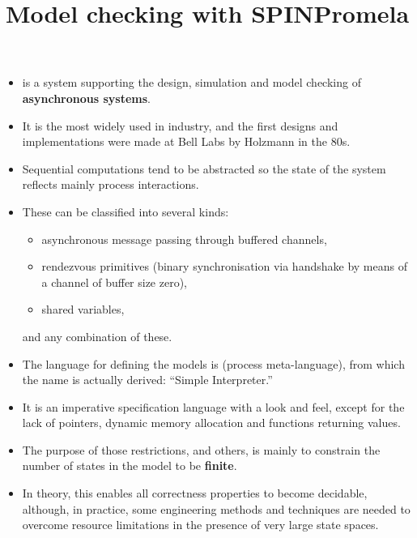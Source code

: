 \documentclass[wide]{slides}
\begin{document}
\begin{slide}
  \title{Model checking with SPIN}

  \begin{itemize}

    \item \SPIN is a system supporting the design, simulation
      and model checking of \textbf{asynchronous systems}.

    \item It is the most widely used in industry, and the first
      designs and implementations were made at Bell Labs by Holzmann
      in the 80s.

    \item Sequential computations tend to be abstracted so the state
      of the system reflects mainly process interactions.

    \item These can be classified into several kinds:
      \begin{itemize}

        \item asynchronous message passing through buffered channels,

        \item rendezvous primitives (binary synchronisation via
          handshake by means of a channel of buffer size zero),

        \item shared variables,

      \end{itemize}
      and any combination of these.

  \end{itemize}

\end{slide}

\begin{slide}
  \title{Promela}

  \begin{itemize}

    \item The language for defining the models is \Promela (process
      meta\hyp{}language), from which the name \SPIN is actually
      derived: ``Simple \Promela Interpreter.''

    \item It is an imperative specification language with a \Clang
      look and feel, except for the lack of pointers, dynamic memory
      allocation and functions returning values.

    \item The purpose of those restrictions, and others, is mainly to
      constrain the number of states in the model to be
      \textbf{finite}.

    \item In theory, this enables all correctness properties to become
      decidable, although, in practice, some engineering methods and
      techniques are needed to overcome resource limitations in the
      presence of very large state spaces.

  \end{itemize}
\end{slide}
\end{document}
